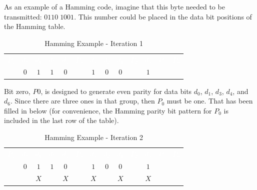 As an example of a Hamming code, imagine that this byte needed to be transmitted: $ 0110 \; 1001 $. This number could be placed in the data bit positions of the Hamming table. 

\begin{table}[H]
  \sffamily
  \newcommand{\head}[1]{\textcolor{white}{\textbf{#1}}}		
  \begin{center}
    \begin{tabular}{ccccccccccccc} 
      \rowcolor{black!75}
      \head{$ P_4 $} & \head{$ d_7 $} & \head{$ d_6 $} &
      \head{$ d_5 $} & \head{$ d_4 $} & \head{$ P_3 $} &
      \head{$ d_3 $} & \head{$ d_2 $} & \head{$ d_1 $} &
      \head{$ P_2 $} & \head{$ d_0 $} & \head{$ P_1 $} &
      \head{$ P_0 $} \\
      \color{gray}{$ 0 $} & $ 0 $ & $ 1 $ &
      $ 1 $ & $ 0 $ & \color{gray}{$ 0 $} &
      $ 1 $ & $ 0 $ & $ 0 $ &
      \color{gray}{$ 0 $} & $ 1 $ & \color{gray}{$ 0 $} &
      \color{gray}{$ 0 $}
    \end{tabular}
  \end{center}
  \caption{Hamming Example - Iteration 1}
  \label{cl:tab:hamming_example_iteration_1}
\end{table}

Bit zero, $ P0 $, is designed to generate even parity for data bits $ d_0 $, $ d_1 $, $ d_3 $, $ d_4 $, and $ d_6 $. Since there are three ones in that group, then $ P_0 $ must be one. That has been filled in below (for convenience, the Hamming parity bit pattern for $ P_0 $ is included in the last row of the table). 

\begin{table}[H]
  \sffamily
  \newcommand{\head}[1]{\textcolor{white}{\textbf{#1}}}		
  \begin{center}
    \begin{tabular}{ccccccccccccc} 
      \rowcolor{black!75}
      \head{$ P_4 $} & \head{$ d_7 $} & \head{$ d_6 $} &
      \head{$ d_5 $} & \head{$ d_4 $} & \head{$ P_3 $} &
      \head{$ d_3 $} & \head{$ d_2 $} & \head{$ d_1 $} &
      \head{$ P_2 $} & \head{$ d_0 $} & \head{$ P_1 $} &
      \head{$ P_0 $} \\
      \color{gray}{$ 0 $} & $ 0 $ & $ 1 $ &
      $ 1 $ & $ 0 $ & \color{gray}{$ 0 $} &
      $ 1 $ & $ 0 $ & $ 0 $ &
      \color{gray}{$ 0 $} & $ 1 $ & \color{gray}{$ 0 $} &
      \color{red}{$ 1 $} \\
      \color{gray}{$ 0 $} & \color{gray}{$ 0 $} & $ X $ &
      \color{gray}{$ 0 $} & $ X $ & \color{gray}{$ 0 $} &
      $ X $ & \color{gray}{$ 0 $} & $ X $ &
      \color{gray}{$ 0 $} & $ X $ & \color{gray}{$ 0 $} &
      \color{red}{$ P $} \\      
    \end{tabular}
  \end{center}
  \caption{Hamming Example - Iteration 2}
  \label{cl:tab:hamming_example_iteration_2}
\end{table}

